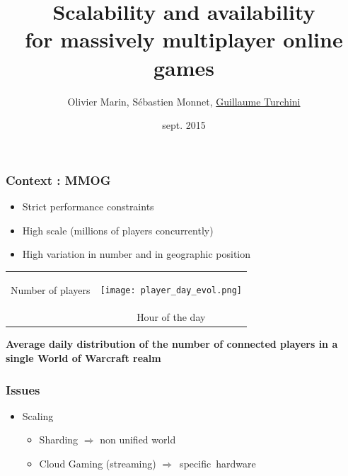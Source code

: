 \documentclass{beamer}
\title[Scalability and availability for MMOG]{Scalability and availability\\ for massively multiplayer online games}
\author{Olivier Marin, Sébastien Monnet, \underline{Guillaume Turchini}}
\institute{EDCC}
\date{sept. 2015}
\begin{document}
\begin{frame}
  \titlepage
\end{frame}

\begin{frame}
  \frametitle{Context : MMOG}
  \begin{itemize}
    \item{Strict performance constraints}
    \item{High scale (millions of players concurrently)}
    \item{High variation in number and in geographic position}
  \end{itemize}
  \vspace{0.5cm}

  \centering
  \begin{tabular}{cc}
    \begin{sideways}\scriptsize{Number of players}\end{sideways} &
    \texttt{[image: player\_day\_evol.png]}\\
    & \scriptsize{Hour of the day}
  \end{tabular}
  
  \scriptsize\textbf{Average daily distribution of the number of connected players in a single World of Warcraft realm}\\

 
\end{frame}

\begin{frame}
  \frametitle{Issues}
  \begin{itemize}
    \item{Scaling}
    \begin{itemize}
      \item{Sharding \qquad {} \qquad $\Rightarrow$ non unified world}
      \item{Cloud Gaming (streaming)  $\Rightarrow$~specific~hardware}
    \end{itemize}
  \end{itemize}

  
\end{frame}
\end{document}
